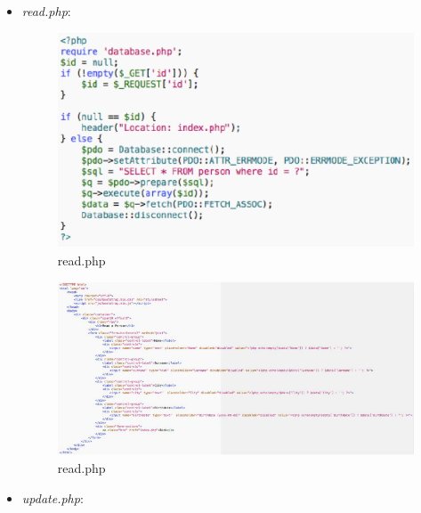 \begin{itemize}
\item{\textit{read.php}}:

\begin{center}
\begin{figure}[H]
\centering
\includegraphics[scale=1]{figures/readphp.png}
\caption{read.php} 
\end{figure}
\end{center}

\begin{center}
\begin{figure}[H]
\centering
\includegraphics[scale=0.8]{figures/readphp2.png}
\caption{read.php} 
\end{figure}
\end{center}

\item{\textit{update.php}}:


\end{itemize}

